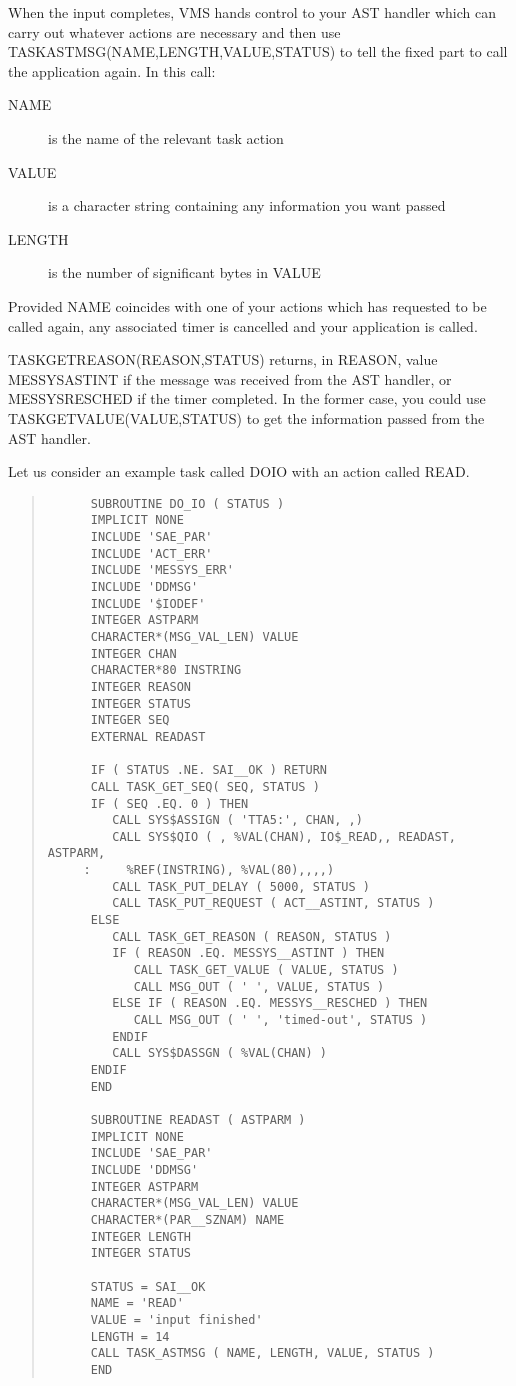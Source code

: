 \documentclass[twoside,11pt]{article}
\renewcommand{\_}{\texttt{\symbol{95}}}
\begin{document}
When the input completes, VMS hands control to your AST handler which
can carry out whatever actions are necessary and then use
TASK\_ASTMSG(NAME,LENGTH,VALUE,STATUS) to tell the fixed part to call the
application again. In this call:
\begin{description}
\item[NAME] is the name of the relevant task
action
\item[VALUE] is a character string containing any information you want
passed
\item[LENGTH] is the number of significant bytes in VALUE
\end{description}

Provided NAME coincides with one of your actions which has requested to be
called again, any associated timer is cancelled and your application is called.

TASK\_GET\_REASON(REASON,STATUS) returns, in REASON, value
MESSYS\_\_ASTINT if the message was received from the AST handler,
or MESSYS\_\-\_\-RESCHED if the timer completed.
In the former case, you could use
TASK\_GET\_VALUE(VALUE,STATUS) to get the information passed from the AST
handler.

Let us consider an example task called DO\_IO with an action called READ.


\small \begin{quote} \begin{verbatim}
      SUBROUTINE DO_IO ( STATUS )
      IMPLICIT NONE
      INCLUDE 'SAE_PAR'
      INCLUDE 'ACT_ERR'
      INCLUDE 'MESSYS_ERR'
      INCLUDE 'DDMSG'
      INCLUDE '$IODEF'
      INTEGER ASTPARM
      CHARACTER*(MSG_VAL_LEN) VALUE
      INTEGER CHAN
      CHARACTER*80 INSTRING
      INTEGER REASON
      INTEGER STATUS
      INTEGER SEQ
      EXTERNAL READAST

      IF ( STATUS .NE. SAI__OK ) RETURN
      CALL TASK_GET_SEQ( SEQ, STATUS )
      IF ( SEQ .EQ. 0 ) THEN
         CALL SYS$ASSIGN ( 'TTA5:', CHAN, ,)
         CALL SYS$QIO ( , %VAL(CHAN), IO$_READ,, READAST, ASTPARM,
     :     %REF(INSTRING), %VAL(80),,,,)
         CALL TASK_PUT_DELAY ( 5000, STATUS )
         CALL TASK_PUT_REQUEST ( ACT__ASTINT, STATUS )
      ELSE
         CALL TASK_GET_REASON ( REASON, STATUS )
         IF ( REASON .EQ. MESSYS__ASTINT ) THEN
            CALL TASK_GET_VALUE ( VALUE, STATUS )
            CALL MSG_OUT ( ' ', VALUE, STATUS )
         ELSE IF ( REASON .EQ. MESSYS__RESCHED ) THEN
            CALL MSG_OUT ( ' ', 'timed-out', STATUS )
         ENDIF
         CALL SYS$DASSGN ( %VAL(CHAN) )
      ENDIF
      END

      SUBROUTINE READAST ( ASTPARM )
      IMPLICIT NONE
      INCLUDE 'SAE_PAR'
      INCLUDE 'DDMSG'
      INTEGER ASTPARM
      CHARACTER*(MSG_VAL_LEN) VALUE
      CHARACTER*(PAR__SZNAM) NAME
      INTEGER LENGTH
      INTEGER STATUS

      STATUS = SAI__OK
      NAME = 'READ'
      VALUE = 'input finished'
      LENGTH = 14
      CALL TASK_ASTMSG ( NAME, LENGTH, VALUE, STATUS )
      END
\end{verbatim} \end{quote} \normalsize
\end{document}
